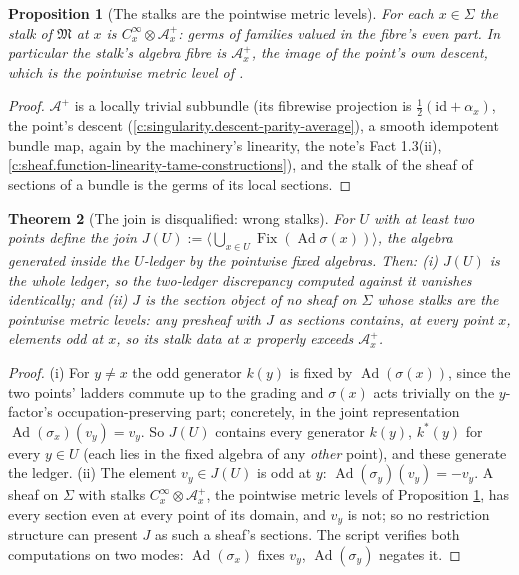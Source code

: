 \documentclass[11pt]{article}
\newtheorem{theorem}{Theorem}[section]
\newtheorem{proposition}[theorem]{Proposition}
\theoremstyle{definition}
\theoremstyle{plain}
\providecommand{\Aa}{}\renewcommand{\Aa}{\mathcal{A}}
\providecommand{\Sig}{}\renewcommand{\Sig}{\Sigma}
\providecommand{\id}{}\renewcommand{\id}{\mathrm{id}}
\begin{document}
\begin{proposition}[The stalks are the pointwise metric levels]\label{c:three-routes.stalks-are-pointwise-metric-levels}
For each $x \in \Sig$ the stalk of $\mathfrak{M}$ at $x$ is $C^\infty_x \otimes \Aa_x^{+}$: germs of families valued in the fibre's even part. In particular the stalk's algebra fibre is $\Aa_x^{+}$, the image of the point's own descent, which is the pointwise metric level of \cite[Prop.~5.5, Thm.~5.7]{ButlerT5}.
\end{proposition}
\begin{proof}
$\Aa^{+}$ is a locally trivial subbundle (its fibrewise projection is $\tfrac12(\id + \alpha_x)$, the point's descent (\ref{c:singularity.descent-parity-average}), a smooth idempotent bundle map, again by the machinery's linearity, the note's Fact 1.3(ii), \ref{c:sheaf.function-linearity-tame-constructions}), and the stalk of the sheaf of sections of a bundle is the germs of its local sections.

\end{proof}

\begin{theorem}[The join is disqualified: wrong stalks]\label{c:three-routes.join-disqualified-wrong-stalks}
For $U$ with at least two points define the join $J(U) := \bigl\langle \bigcup_{x \in U} \operatorname{Fix}(\operatorname{Ad}\sigma(x)) \bigr\rangle$, the algebra generated inside the $U$-ledger by the pointwise fixed algebras. Then: (i) $J(U)$ is the whole ledger, so the two-ledger discrepancy computed against it vanishes identically; and (ii) $J$ is the section object of no sheaf on $\Sig$ whose stalks are the pointwise metric levels: any presheaf with $J$ as sections contains, at every point $x$, elements odd at $x$, so its stalk data at $x$ properly exceeds $\Aa_x^{+}$.
\end{theorem}
\begin{proof}
(i) For $y \neq x$ the odd generator $k(y)$ is fixed by $\operatorname{Ad}(\sigma(x))$, since the two points' ladders commute up to the grading and $\sigma(x)$ acts trivially on the $y$-factor's occupation-preserving part; concretely, in the joint representation $\operatorname{Ad}(\sigma_x)(v_y) = v_y$. So $J(U)$ contains every generator $k(y)$, $k^{*}(y)$ for every $y \in U$ (each lies in the fixed algebra of any \emph{other} point), and these generate the ledger. (ii) The element $v_y \in J(U)$ is odd at $y$: $\operatorname{Ad}(\sigma_y)(v_y) = -v_y$. A sheaf on $\Sig$ with stalks $C^\infty_x \otimes \Aa_x^{+}$, the pointwise metric levels of Proposition \ref{c:three-routes.stalks-are-pointwise-metric-levels}, has every section even at every point of its domain, and $v_y$ is not; so no restriction structure can present $J$ as such a sheaf's sections. The script verifies both computations on two modes: $\operatorname{Ad}(\sigma_x)$ fixes $v_y$, $\operatorname{Ad}(\sigma_y)$ negates it.

\end{proof}
\end{document}

